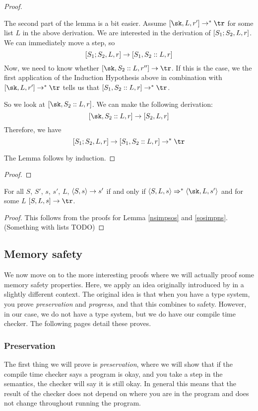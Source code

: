 \begin{proof}
\begin{itemize}[noitemsep]
    The second part of the lemma is a bit easier. Assume $\cc{\sk}{L}{r'} \to ^{*} \tr$ for some list $L$ in the above derivation. We are interested in the derivation of $[ S_1;S_2, L, r ]$. We can immediately move a step, so
    $$[ S_1;S_2, L, r ] \to [ S_1, S_2::L, r ]$$
    Now, we need to know whether $\cc{\sk}{S_2::L}{r''} \to \tr$. If this is the case, we the first application of the Induction Hypothesis above in combination with $\cc{\sk}{L}{r'} \to ^{*} \tr$ tells us that $\cc{S_1}{S_2::L}{r} \to ^{*} \tr$.
    
    So we look at $\cc{\sk}{S_2::L}{r}$. We can make the following derivation:
    $$\cc{\sk}{S_2::L}{r} \to \cc{S_2}{L}{r}$$
    Therefore, we have 
    $$\cc{S_1;S_2}{L}{r} \to \cc{S_1}{S_2::L}{r} \to ^{*} \tr$$
    
\end{itemize}
The Lemma follows by induction. 
\end{proof}

\begin{lemma}
\label{sosimpns}
\end{lemma}
\begin{proof}
\end{proof}

\begin{theorem}
For all $S$, $S'$, $s$, $s'$, $L$, $\langle S, s \rangle \to s'$ if and only if $\sos{S}{L}{s} \Rightarrow ^{*} \sos{\sk}{L}{s'}$ and for some $L$ $\cc{S}{L}{s} \to \tr$.
\end{theorem}

\begin{proof}
This follows from the proofs for Lemma \ref{nsimpsos} and \ref{sosimpns}. (Something with lists TODO) %
\end{proof}

\subsection{Memory safety}
We now move on to the more interesting proofs where we will actually proof some memory safety properties. Here, we apply an idea originally introduced by \cite{wright1994syntactic} in a slightly different context. The original idea is that when you have a type system, you prove \emph{preservation} and \emph{progress}, and that this combines to safety. However, in our case, we do not have a type system, but we do have our compile time checker. The following pages detail these proves.

\subsubsection*{Preservation}
The first thing we will prove is \emph{preservation}, where we will show that if the compile time checker says a program is okay, and you take a step in the semantics, the checker will say it is still okay. In general this means that the result of the checker does not depend on where you are in the program and does not change throughout running the program. 

